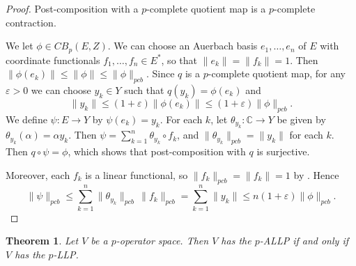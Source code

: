 \documentclass[12pt]{article}
\newtheorem{theorem}{Theorem}[section]
\newcommand{\pcb}{pcb}
\newcommand{\CBp}{CB_p}
\begin{document}
\begin{proof}
Post-composition with a $p$-complete quotient map is a $p$-complete contraction.

We let $\phi\in\CBp(E,Z)$. We can choose an Auerbach basis $e_1,\ldots,e_n$ of $E$ with coordinate functionals $f_1,\ldots,f_n\in E^*$, so that $\|e_k\|=\|f_k\|=1$. Then $\|\phi(e_k)\|\leq\|\phi\|\leq\|\phi\|_{\pcb}$. Since $q$ is a $p$-complete quotient map, for any $\varepsilon>0$ we can choose $y_k\in Y$ such that $q(y_k)=\phi(e_k)$ and
\[
        \|y_k\|\leq (1+\varepsilon)\|\phi(e_k)\|\leq (1+\varepsilon)\|\phi\|_{\pcb}.
\]
We define $\psi:E\to Y$ by $\psi(e_k)=y_k$. For each $k$, let $\theta_{y_k}:\mathbb{C}\to Y$ be given by $\theta_{y_k}(\alpha)=\alpha y_k$. Then $\psi=\sum_{k=1}^n \theta_{y_k}\circ f_k$, and $\|\theta_{y_k}\|_{\pcb}=\|y_k\|$ for each $k$.
Then $q\circ\psi=\phi$, which shows that post-composition with $q$ is surjective.

Moreover, each $f_k$ is a linear functional, so $\|f_k\|_{\pcb}=\|f_k\|=1$ by \cite[Lemma 4.2]{Daws2007}.
Hence
\[
        \|\psi\|_{\pcb}
        \leq \sum_{k=1}^n \|\theta_{y_k}\|_{\pcb}\,\|f_k\|_{\pcb}
        =\sum_{k=1}^n \|y_k\|
        \leq n(1+\varepsilon)\|\phi\|_{\pcb}.
\]
\end{proof}

\begin{theorem}\label{thm:main}
Let $V$ be a $p$-operator space.  Then $V$ has the
$p$-ALLP if and only if $V$ has the $p$-LLP.
\end{theorem}
\end{document}
